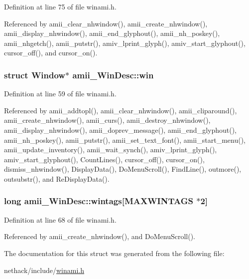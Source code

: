 Definition at line 75 of file winami.\+h.



Referenced by amii\+\_\+clear\+\_\+nhwindow(), amii\+\_\+create\+\_\+nhwindow(), amii\+\_\+display\+\_\+nhwindow(), amii\+\_\+end\+\_\+glyphout(), amii\+\_\+nh\+\_\+poskey(), amii\+\_\+nhgetch(), amii\+\_\+putstr(), amiv\+\_\+lprint\+\_\+glyph(), amiv\+\_\+start\+\_\+glyphout(), cursor\+\_\+off(), and cursor\+\_\+on().

\hypertarget{structamii__WinDesc_a9835faa4d66643cd889203e26edee8ae}{
\subsubsection[{win}]{\setlength{\rightskip}{0pt plus 5cm}struct Window$\ast$ amii\+\_\+\+Win\+Desc\+::win}}\label{structamii__WinDesc_a9835faa4d66643cd889203e26edee8ae}


Definition at line 59 of file winami.\+h.



Referenced by amii\+\_\+addtopl(), amii\+\_\+clear\+\_\+nhwindow(), amii\+\_\+cliparound(), amii\+\_\+create\+\_\+nhwindow(), amii\+\_\+curs(), amii\+\_\+destroy\+\_\+nhwindow(), amii\+\_\+display\+\_\+nhwindow(), amii\+\_\+doprev\+\_\+message(), amii\+\_\+end\+\_\+glyphout(), amii\+\_\+nh\+\_\+poskey(), amii\+\_\+putstr(), amii\+\_\+set\+\_\+text\+\_\+font(), amii\+\_\+start\+\_\+menu(), amii\+\_\+update\+\_\+inventory(), amii\+\_\+wait\+\_\+synch(), amiv\+\_\+lprint\+\_\+glyph(), amiv\+\_\+start\+\_\+glyphout(), Count\+Lines(), cursor\+\_\+off(), cursor\+\_\+on(), dismiss\+\_\+nhwindow(), Display\+Data(), Do\+Menu\+Scroll(), Find\+Line(), outmore(), outsubstr(), and Re\+Display\+Data().

\hypertarget{structamii__WinDesc_a982df47148570e92162c13c1d158ef1b}{
\subsubsection[{wintags}]{\setlength{\rightskip}{0pt plus 5cm}long amii\+\_\+\+Win\+Desc\+::wintags\mbox{[}{\bf M\+A\+X\+W\+I\+N\+T\+A\+G\+S} $\ast$2\mbox{]}}}\label{structamii__WinDesc_a982df47148570e92162c13c1d158ef1b}


Definition at line 68 of file winami.\+h.



Referenced by amii\+\_\+create\+\_\+nhwindow(), and Do\+Menu\+Scroll().



The documentation for this struct was generated from the following file\+:\begin{DoxyCompactItemize}
\item 
nethack/include/\hyperlink{winami_8h}{winami.\+h}\end{DoxyCompactItemize}
